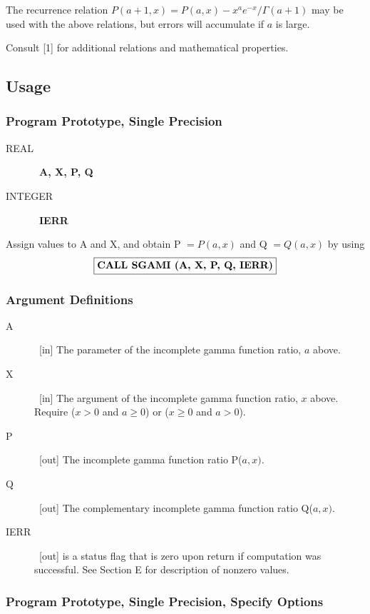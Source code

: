 \documentclass[twoside]{MATH77}
\begin{document}
The recurrence relation $P(a+1,x) = P(a,x)-x^a e^{-x} / \Gamma (a+1)$
may be used with the above relations, but errors will accumulate if
$a$ is large.

Consult [1] for additional relations and mathematical properties.

\subsection{Usage}

\subsubsection{Program Prototype, Single Precision}

\begin{description}
\item[REAL]  \ {\bf A, X, P, Q}

\item[INTEGER]  \ {\bf IERR}
\end{description}

Assign values to A and X, and obtain P $= P(a,x)$ and Q $=Q(a,x)$ by using
$$
\fbox{{\bf CALL SGAMI (A, X, P, Q, IERR)}}
$$
\subsubsection{Argument Definitions}

\begin{description}
\item[A]  \ [in] The parameter of the incomplete gamma function ratio, $a$
above.

\item[X]  \ [in] The argument of the incomplete gamma function ratio, $x$
above.  Require ($x > 0$ and $a \geq 0$) or ($x \geq 0$ and $a > 0$).

\item[P]  \ [out] The incomplete gamma function ratio P($a,x).$

\item[Q]  \ [out] The complementary incomplete gamma function ratio Q($a,x).$

\item[IERR]  \ [out] is a status flag that is zero upon return if
computation was successful. See Section E for description of nonzero values.
\end{description}

\subsubsection{Program Prototype, Single Precision, Specify Options}
\end{document}
